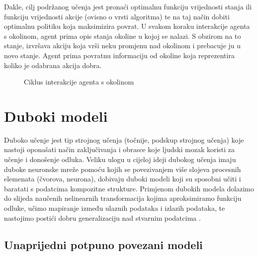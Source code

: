 \bigskip

Dakle, cilj podržanog učenja jest pronaći optimalnu funkciju vrijednosti stanja ili funkciju vrijednosti akcije (ovisno o vrsti algoritma) te na taj način dobiti optimalnu politiku koja maksimizira povrat. U svakom koraku interakcije agenta s okolinom, agent prima opis stanja okoline u kojoj se nalazi. S obzirom na to stanje, izvršava akciju koja vrši neku promjenu nad okolinom i prebacuje ju u novo stanje. Agent prima povratnu informaciju od okoline koja reprezentira koliko je odabrana akcija dobra.

\begin{figure}[H]
    \centering
    \caption{Ciklus interakcije agenta s okolinom \cite{wikiRL}}
    \label{fig:rl}
\end{figure}

\section{Duboki modeli}
\label{chap:duboki-modeli}

Duboko učenje  jest tip strojnog učenja (točnije, podskup strojnog učenja) koje nastoji oponašati način zaključivanja i obrasce koje ljudski mozak koristi za učenje i donošenje odluka. Veliku ulogu u cijeloj ideji dubokog učenja imaju duboke neuronske mreže  pomoću kojih se povezivanjem više slojeva procesnih elemenata (čvorova, neurona), dobivaju duboki modeli koji su sposobni učiti i baratati s podatcima kompozitne strukture. Primjenom dubokih modela dolazimo do slijeda naučenih nelinearnih transformacija kojima aproksimiramo funkciju odluke, učimo mapiranje između ulaznih podataka i izlazih podataka, te nastojimo postići dobru generalizaciju nad stvarnim podatcima \cite{DLBook}. 

\subsection{Unaprijedni potpuno povezani modeli}


